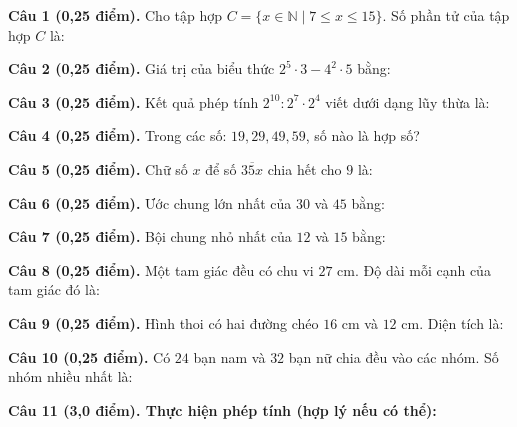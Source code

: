\documentclass[12pt,a4paper]{article}
\begin{document}
\noindent\textbf{Câu 1 (0,25 điểm).} Cho tập hợp $C = \{x \in \mathbb{N} \mid 7 \le x \le 15\}$. Số phần tử của tập hợp $C$ là: \par\vspace{0.25mm}
\noindent\textbf{Câu 2 (0,25 điểm).} Giá trị của biểu thức $2^5 \cdot 3 - 4^2 \cdot 5$ bằng: \par\vspace{0.25mm}
\noindent\textbf{Câu 3 (0,25 điểm).} Kết quả phép tính $2^{10} : 2^7 \cdot 2^4$ viết dưới dạng lũy thừa là: \par\vspace{0.25mm}
\noindent\textbf{Câu 4 (0,25 điểm).} Trong các số: $19, 29, 49, 59$, số nào là hợp số? \par\vspace{0.25mm}
\noindent\textbf{Câu 5 (0,25 điểm).} Chữ số $x$ để số $\overline{35x}$ chia hết cho $9$ là: \par\vspace{0.25mm}
\noindent\textbf{Câu 6 (0,25 điểm).} Ước chung lớn nhất của $30$ và $45$ bằng: \par\vspace{0.25mm}
\noindent\textbf{Câu 7 (0,25 điểm).} Bội chung nhỏ nhất của $12$ và $15$ bằng: \par\vspace{0.25mm}
\noindent\textbf{Câu 8 (0,25 điểm).} Một tam giác đều có chu vi $27\text{ cm}$. Độ dài mỗi cạnh của tam giác đó là: \par\vspace{0.25mm}
\noindent\textbf{Câu 9 (0,25 điểm).} Hình thoi có hai đường chéo $16\text{ cm}$ và $12\text{ cm}$. Diện tích là: \par\vspace{0.25mm}
\noindent\textbf{Câu 10 (0,25 điểm).} Có $24$ bạn nam và $32$ bạn nữ chia đều vào các nhóm. Số nhóm nhiều nhất là: \par\vspace{0.25mm}

\vspace{0.3mm}
\noindent\textbf{Câu 11 (3,0 điểm). Thực hiện phép tính (hợp lý nếu có thể):}
\vspace{0.4mm}
\end{document}
